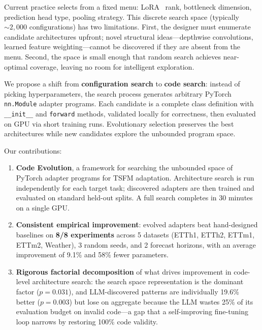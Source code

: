 \documentclass{article}
\begin{document}
Current practice selects from a fixed menu: LoRA~\cite{hu2022lora} rank, bottleneck dimension, prediction head type, pooling strategy. This discrete search space (typically ${\sim}2{,}000$ configurations) has two limitations. First, the designer must enumerate candidate architectures upfront; novel structural ideas---depthwise convolutions, learned feature weighting---cannot be discovered if they are absent from the menu. Second, the space is small enough that random search achieves near-optimal coverage, leaving no room for intelligent exploration.

We propose a shift from \textbf{configuration search} to \textbf{code search}: instead of picking hyperparameters, the search process generates arbitrary PyTorch \texttt{nn.Module} adapter programs. Each candidate is a complete class definition with \texttt{\_\_init\_\_} and \texttt{forward} methods, validated locally for correctness, then evaluated on GPU via short training runs. Evolutionary selection preserves the best architectures while new candidates explore the unbounded program space.

Our contributions:

\begin{enumerate}
\item \textbf{Code Evolution}, a framework for searching the unbounded space of PyTorch adapter programs for TSFM adaptation. Architecture search is run independently for each target task; discovered adapters are then trained and evaluated on standard held-out splits. A full search completes in 30 minutes on a single GPU.

\item \textbf{Consistent empirical improvement}: evolved adapters beat hand-designed baselines on \textbf{8/8 experiments} across 5 datasets (ETTh1, ETTh2, ETTm1, ETTm2, Weather), 3 random seeds, and 2 forecast horizons, with an average improvement of 9.1\% and 58\% fewer parameters.

\item \textbf{Rigorous factorial decomposition} of what drives improvement in code-level architecture search: the search space representation is the dominant factor ($p{=}0.031$), and LLM-discovered patterns are individually 19.6\% better ($p{=}0.003$) but lose on aggregate because the LLM wastes 25\% of its evaluation budget on invalid code---a gap that a self-improving fine-tuning loop narrows by restoring 100\% code validity.
\end{enumerate}
\end{document}
